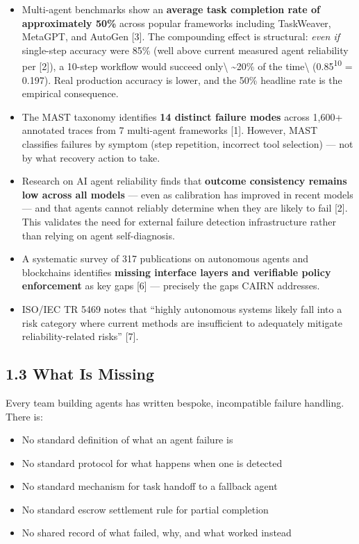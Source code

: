 \documentclass[
  10pt,
]{article}
\providecommand{\tightlist}{%
  \setlength{\itemsep}{0pt}\setlength{\parskip}{0pt}}
\begin{document}
\begin{itemize}
\item
  Multi-agent benchmarks show an \textbf{average task completion rate of
  approximately 50\%} across popular frameworks including TaskWeaver,
  MetaGPT, and AutoGen {[}3{]}. The compounding effect is structural:
  \emph{even if} single-step accuracy were 85\% (well above current
  measured agent reliability per {[}2{]}), a 10-step workflow would
  succeed only\textbackslash{} \textasciitilde20\% of the
  time\textbackslash{} (0.85\textsuperscript{10} = 0.197). Real
  production accuracy is lower, and the 50\% headline rate is the
  empirical consequence.
\item
  The MAST taxonomy identifies \textbf{14 distinct failure modes} across
  1,600+ annotated traces from 7 multi-agent frameworks {[}1{]}.
  However, MAST classifies failures by symptom (step repetition,
  incorrect tool selection) --- not by what recovery action to take.
\item
  Research on AI agent reliability finds that \textbf{outcome
  consistency remains low across all models} --- even as calibration has
  improved in recent models --- and that agents cannot reliably determine
  when they are likely to fail {[}2{]}. This validates the need for external
  failure detection infrastructure rather than relying on agent self-diagnosis.
\item
  A systematic survey of 317 publications on autonomous agents and
  blockchains identifies \textbf{missing interface layers and verifiable
  policy enforcement} as key gaps {[}6{]} --- precisely the gaps CAIRN
  addresses.
\item
  ISO/IEC TR 5469 notes that ``highly autonomous systems likely fall
  into a risk category where current methods are insufficient to
  adequately mitigate reliability-related risks'' {[}7{]}.
\end{itemize}

\hypertarget{what-is-missing}{%
\subsection{1.3 What Is Missing}\label{what-is-missing}}

Every team building agents has written bespoke, incompatible failure
handling. There is:

\begin{itemize}
\tightlist
\item
  No standard definition of what an agent failure is
\item
  No standard protocol for what happens when one is detected
\item
  No standard mechanism for task handoff to a fallback agent
\item
  No standard escrow settlement rule for partial completion
\item
  No shared record of what failed, why, and what worked instead
\end{itemize}
\end{document}
